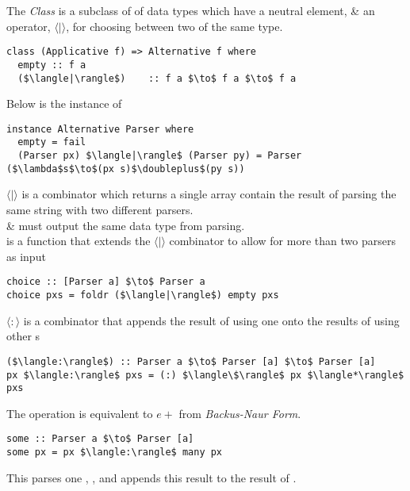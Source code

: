 \documentclass[11pt,a4paper]{article}
\begin{document}
The {} \textit{Class} is a subclass of {} of data types which have a neutral element,{} \& an operator, $\langle|\rangle$, for choosing between two of the same type.
\begin{lstlisting}
class (Applicative f) => Alternative f where
  empty :: f a
  ($\langle|\rangle$)    :: f a $\to$ f a $\to$ f a
\end{lstlisting}

Below is the {} instance of {}
\begin{lstlisting}
instance Alternative Parser where
  empty = fail
  (Parser px) $\langle|\rangle$ (Parser py) = Parser ($\lambda$s$\to$(px s)$\doubleplus$(py s))
\end{lstlisting}
$\langle|\rangle$ is a combinator which returns a single array contain the result of parsing the same string with two different parsers.\\
 \& {} must output the same data type from parsing.\\

{} is a function that extends the $\langle|\rangle$ combinator to allow for more than two parsers as input
\begin{lstlisting}
choice :: [Parser a] $\to$ Parser a
choice pxs = foldr ($\langle|\rangle$) empty pxs
\end{lstlisting}

$\langle:\rangle$ is a combinator that appends the result of using one {} onto the results of using other {}s
\begin{lstlisting}
($\langle:\rangle$) :: Parser a $\to$ Parser [a] $\to$ Parser [a]
px $\langle:\rangle$ pxs = (:) $\langle\$\rangle$ px $\langle*\rangle$ pxs
\end{lstlisting}

The {} operation is equivalent to $e+$ from \textit{Backus-Naur Form}.
\begin{lstlisting}
some :: Parser a $\to$ Parser [a]
some px = px $\langle:\rangle$ many px
\end{lstlisting}
This parses one {}, {}, and appends this result to the result of {}.\\
\end{document}
